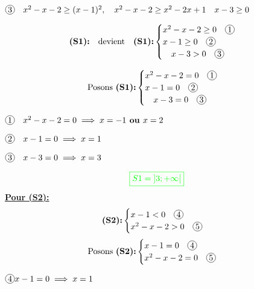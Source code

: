 \documentclass[12pt,a4paper]{article}
\begin{document}
\begin{enumerate}
\begin{enumerate}
\(
\encercle{3}\quad x^2 - x - 2 \geq (x-1)^2 , \\
\quad x^2 - x - 2 \geq x^{2}-2x+1\\
\quad x - 3 \geq 0
\)


\[\textbf{(S1):} \quad \text{devient} \quad \textbf{(S1):}
\begin{cases}
x^2 - x - 2 \geq 0  \quad \encercle{1}\\
x - 1 \geq 0  \quad \encercle{2}\\
\quad x - 3 > 0 \quad \encercle{3}
\end{cases}
\]

\[\text{Posons }\textbf{(S1):}
\begin{cases}
x^2 - x - 2 = 0  \quad \encercle{1}\\
x - 1  = 0 \quad \encercle{2}\\
\quad x - 3 = 0 \quad \encercle{3}
\end{cases}
\]

\(\encercle{1} \quad x^2 - x - 2 = 0 \implies x=-1 \textbf{ ou } x=2\)

\(\encercle{2} \quad x - 1 = 0 \implies x=1 \)

\(\encercle{3} \quad x - 3 = 0 \implies x=3 \)
\begin{flushleft}
\end{flushleft}
\[
\textcolor{green}{\boxed{S1 = \left]3 ; +\infty\right[  }} 
\]
\underline{\textbf{Pour (S2):}}
\[
\textbf{(S2):}\begin{cases}
x - 1 < 0 \quad \encercle{4} \\
x^2 - x - 2 > 0 \quad \encercle{5}
\end{cases}
\]
\[\text{Posons }\textbf{(S2):}
\begin{cases}
x - 1 = 0 \quad \encercle{4} \\
x^2 - x - 2 = 0 \quad \encercle{5}
\end{cases}
\]

\( \encercle{4} x - 1 = 0 \implies x=1\)


\end{enumerate}
\end{enumerate}
\end{document}
